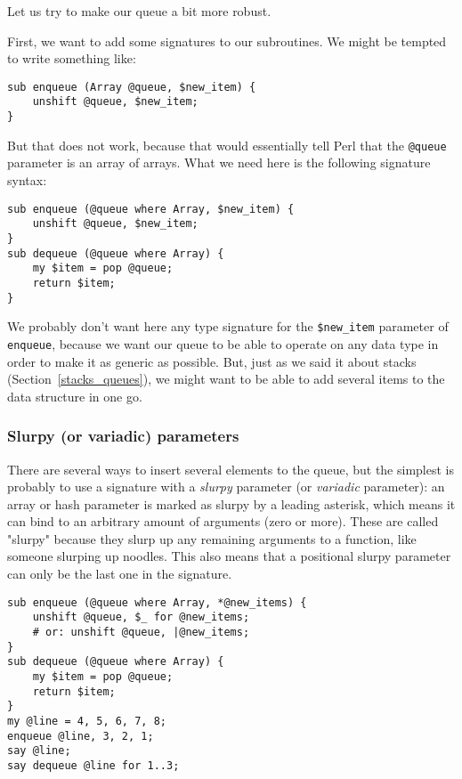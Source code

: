 Let us try to make our queue a bit more robust.

First, we want to add some signatures to our subroutines. We might be tempted to write something like:

\begin{verbatim}
sub enqueue (Array @queue, $new_item) {
    unshift @queue, $new_item;
}
\end{verbatim}

But that does not work, because that would essentially tell 
Perl that the \verb'@queue' parameter is an array of arrays. 
What we need here is the following signature syntax:

\begin{verbatim}
sub enqueue (@queue where Array, $new_item) {
    unshift @queue, $new_item;
}
sub dequeue (@queue where Array) {
    my $item = pop @queue;
    return $item;
}
\end{verbatim}

We probably don't want here any type signature for the \verb'$new_item' parameter of {\tt enqueue}, because we want 
our queue to be able to operate on any data type in order to 
make it as generic as possible. But, just as we said it 
about stacks (Section~\ref{stacks_queues}), we might want to 
be able to add several items to the data structure in one go. 

\subsubsection{Slurpy (or variadic) parameters}

\label{slurpy_params}
There are several ways to insert several elements to the 
queue, but the simplest is probably to use a signature with 
a \emph{slurpy} parameter (or \emph{variadic} parameter): 
an array or hash parameter is marked as slurpy by a leading 
asterisk, which means it can bind to an arbitrary amount 
of arguments (zero or more). These are called "slurpy" because 
they slurp up any remaining arguments to a function, like 
someone slurping up noodles. This also means that a positional 
slurpy parameter can only be the last one in the signature.

\begin{verbatim}
sub enqueue (@queue where Array, *@new_items) {
    unshift @queue, $_ for @new_items;
    # or: unshift @queue, |@new_items;
}
sub dequeue (@queue where Array) {
    my $item = pop @queue;
    return $item;
}
my @line = 4, 5, 6, 7, 8;
enqueue @line, 3, 2, 1;
say @line;
say dequeue @line for 1..3;
\end{verbatim}

